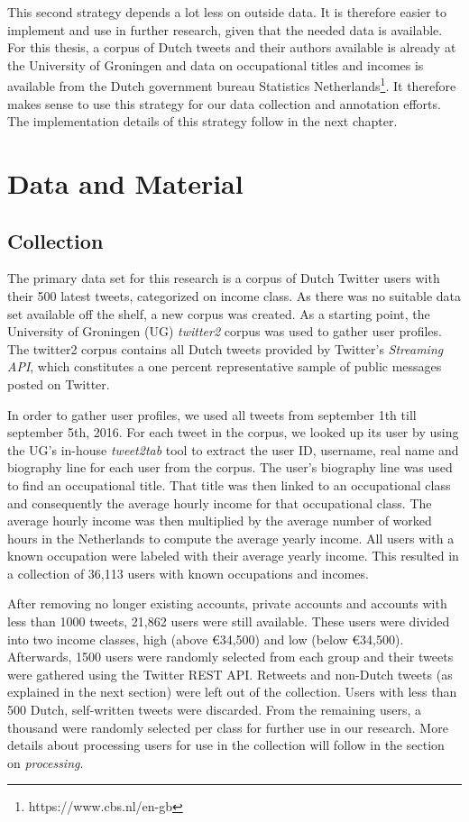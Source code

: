 \documentclass[
10pt, %
a4paper, %
oneside, %
headinclude,footinclude, %
] {book}%
\begin{document}
This second strategy depends a lot less on outside data. It is therefore easier to implement and use in further research, given that the needed data is available.  For this thesis, a corpus of Dutch tweets and their authors available is already at the University of Groningen and data on occupational titles and incomes is available from the Dutch government bureau Statistics Netherlands\footnote{https://www.cbs.nl/en-gb}. It therefore makes sense to use this strategy for our data collection and annotation efforts. The implementation details of this strategy follow in the next chapter.

\chapter{Data and Material}
\label{datagathering}
\section{Collection} 
The primary data set for this research is a corpus of Dutch Twitter users with their 500 latest tweets, categorized on income class. As there was no suitable data set available off the shelf, a new corpus was created. As a starting point, the University of Groningen (UG) \textit{twitter2} corpus was used to gather user profiles. The twitter2 corpus contains all Dutch tweets provided by Twitter's \textit{Streaming API}, which constitutes a one percent representative sample of public messages posted on Twitter. 

In order to gather user profiles, we used all tweets from september 1th till september 5th, 2016. For each tweet in the corpus, we looked up its user by using the UG's in-house \textit{tweet2tab} tool to extract the user ID, username, real name and biography line for each user from the corpus. The user's biography line was used to find an occupational title. That title was then linked to an occupational class and consequently the average hourly income for that occupational class. The average hourly income was then multiplied by the average number of worked hours in the Netherlands to compute the average yearly income. All users with a known occupation were labeled with their average yearly income. This resulted in a collection of 36,113 users with known occupations and incomes.

After removing no longer existing accounts, private accounts and accounts with less than 1000 tweets, 21,862 users were still available. These users were divided into two income classes, high (above \euro 34,500) and low (below \euro 34,500). Afterwards, 1500 users were randomly selected from each group and their tweets were gathered using the Twitter REST API. Retweets and non-Dutch tweets (as explained in the next section) were left out of the collection. Users with less than 500 Dutch, self-written tweets were discarded. From the remaining users, a thousand were randomly selected per class for further use in our research. More details about processing users for use in the collection will follow in the section on \textit{processing}.
\end{document}
